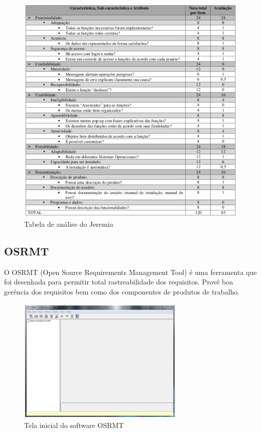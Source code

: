   \begin{figure}[!h]
    \centering
    \includegraphics[width=12cm, keepaspectratio=true]{figuras/ferramentas/jeremia2.eps}
    \caption{Tabela de análise do Jeremia}
  \end{figure}

\subsection{OSRMT}

  O OSRMT (Open Source Requirements Management Tool) é uma ferramenta que foi desenhada para permitir total rastreabilidade dos
  requisitos. Provê boa gerência dos requisitos bem como dos componentes de produtos de trabalho.

  \begin{figure}[!h]
    \centering
    \includegraphics[width=8cm, keepaspectratio=true]{figuras/ferramentas/osrmt1.eps}
    \caption{Tela inicial do software OSRMT}
  \end{figure}

